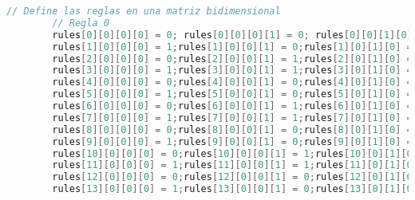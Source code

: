 \documentclass{article}
\begin{document}
\begin{lstlisting}[language=Java, basicstyle=\tiny, breaklines=true, breakatwhitespace=true]
		// Define las reglas en una matriz bidimensional
		// Regla 0
		rules[0][0][0][0] = 0; rules[0][0][0][1] = 0; rules[0][0][1][0] = 0; rules[0][0][1][1] = 0; rules[0][1][0][0] = 0; rules[0][1][0][1] = 0; rules[0][1][1][0] = 0; rules[0][1][1][1] = 0;
		rules[1][0][0][0] = 1;rules[1][0][0][1] = 0;rules[1][0][1][0] = 0;rules[1][0][1][1] = 0;rules[1][1][0][0] = 0;rules[1][1][0][1] = 0;rules[1][1][1][0] = 0;rules[1][1][1][1] = 0;
		rules[2][0][0][0] = 0;rules[2][0][0][1] = 1;rules[2][0][1][0] = 0;rules[2][0][1][1] = 0;rules[2][1][0][0] = 0;rules[2][1][0][1] = 0;rules[2][1][1][0] = 0;rules[2][1][1][1] = 0;
		rules[3][0][0][0] = 1;rules[3][0][0][1] = 1;rules[3][0][1][0] = 0;rules[3][0][1][1] = 0;rules[3][1][0][0] = 0;rules[3][1][0][1] = 0;rules[3][1][1][0] = 0;rules[3][1][1][1] = 0;
		rules[4][0][0][0] = 0;rules[4][0][0][1] = 0;rules[4][0][1][0] = 1;rules[4][0][1][1] = 0;rules[4][1][0][0] = 0;rules[4][1][0][1] = 0;rules[4][1][1][0] = 0;rules[4][1][1][1] = 0;
		rules[5][0][0][0] = 1;rules[5][0][0][1] = 0;rules[5][0][1][0] = 1;rules[5][0][1][1] = 0;rules[5][1][0][0] = 0;rules[5][1][0][1] = 0;rules[5][1][1][0] = 0;rules[5][1][1][1] = 0;
		rules[6][0][0][0] = 0;rules[6][0][0][1] = 1;rules[6][0][1][0] = 1;rules[6][0][1][1] = 0;rules[6][1][0][0] = 0;rules[6][1][0][1] = 0;rules[6][1][1][0] = 0;rules[6][1][1][1] = 0;
		rules[7][0][0][0] = 1;rules[7][0][0][1] = 1;rules[7][0][1][0] = 1;rules[7][0][1][1] = 0;rules[7][1][0][0] = 0;rules[7][1][0][1] = 0;rules[7][1][1][0] = 0;rules[7][1][1][1] = 0;
		rules[8][0][0][0] = 0;rules[8][0][0][1] = 0;rules[8][0][1][0] = 0;rules[8][0][1][1] = 1;rules[8][1][0][0] = 0;rules[8][1][0][1] = 0;rules[8][1][1][0] = 0;rules[8][1][1][1] = 0;
		rules[9][0][0][0] = 1;rules[9][0][0][1] = 0;rules[9][0][1][0] = 0;rules[9][0][1][1] = 1;rules[9][1][0][0] = 0;rules[9][1][0][1] = 0;rules[9][1][1][0] = 0;rules[9][1][1][1] = 0;
		rules[10][0][0][0] = 0;rules[10][0][0][1] = 1;rules[10][0][1][0] = 0;rules[10][0][1][1] = 1;rules[10][1][0][0] = 0;rules[10][1][0][1] = 0;rules[10][1][1][0] = 0;rules[10][1][1][1] = 0;
		rules[11][0][0][0] = 1;rules[11][0][0][1] = 1;rules[11][0][1][0] = 0;rules[11][0][1][1] = 1;rules[11][1][0][0] = 0;rules[11][1][0][1] = 0;rules[11][1][1][0] = 0;rules[11][1][1][1] = 0;
		rules[12][0][0][0] = 0;rules[12][0][0][1] = 0;rules[12][0][1][0] = 1;rules[12][0][1][1] = 1;rules[12][1][0][0] = 0;rules[12][1][0][1] = 0;rules[12][1][1][0] = 0;rules[12][1][1][1] = 0;
		rules[13][0][0][0] = 1;rules[13][0][0][1] = 0;rules[13][0][1][0] = 1;rules[13][0][1][1] = 1;rules[13][1][0][0] = 0;rules[13][1][0][1] = 0;rules[13][1][1][0] = 0;rules[13][1][1][1] = 0;

\end{lstlisting}
\end{document}

